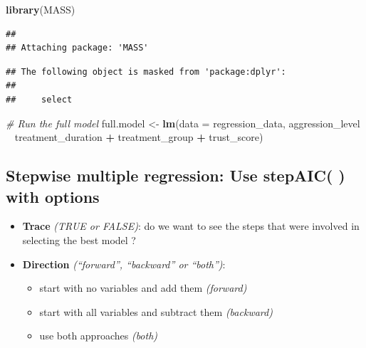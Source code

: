 \documentclass[
]{book}
\newenvironment{Shaded}{\begin{snugshade}}{\end{snugshade}}
\newcommand{\CommentTok}[1]{\textcolor[rgb]{0.56,0.35,0.01}{\textit{#1}}}
\newcommand{\DataTypeTok}[1]{\textcolor[rgb]{0.13,0.29,0.53}{#1}}
\newcommand{\KeywordTok}[1]{\textcolor[rgb]{0.13,0.29,0.53}{\textbf{#1}}}
\newcommand{\NormalTok}[1]{#1}
\newcommand{\OperatorTok}[1]{\textcolor[rgb]{0.81,0.36,0.00}{\textbf{#1}}}
\newcommand{\StringTok}[1]{\textcolor[rgb]{0.31,0.60,0.02}{#1}}
\providecommand{\tightlist}{%
  \setlength{\itemsep}{0pt}\setlength{\parskip}{0pt}}
\begin{document}
\begin{Shaded}
\begin{Highlighting}[]
\KeywordTok{library}\NormalTok{(MASS)}
\end{Highlighting}
\end{Shaded}

\begin{verbatim}
## 
## Attaching package: 'MASS'
\end{verbatim}

\begin{verbatim}
## The following object is masked from 'package:dplyr':
## 
##     select
\end{verbatim}

\begin{Shaded}
\begin{Highlighting}[]
\CommentTok{# Run the full model }
\NormalTok{full.model <-}\StringTok{ }\KeywordTok{lm}\NormalTok{(}\DataTypeTok{data =}\NormalTok{ regression_data, aggression_level }\OperatorTok{~}\StringTok{ }\NormalTok{treatment_duration }\OperatorTok{+}\StringTok{ }\NormalTok{treatment_group }\OperatorTok{+}\StringTok{ }\NormalTok{trust_score)}
\end{Highlighting}
\end{Shaded}

\hypertarget{stepwise-multiple-regression-use-stepaic-with-options}{%
\subsection{Stepwise multiple regression: Use stepAIC( ) with options}\label{stepwise-multiple-regression-use-stepaic-with-options}}

\begin{itemize}
\tightlist
\item
  \textbf{Trace} \emph{(TRUE or FALSE)}: do we want to see the steps that were involved in selecting the best model ?
\item
  \textbf{Direction} \emph{(``forward'', ``backward'' or ``both'')}:

  \begin{itemize}
  \tightlist
  \item
    start with no variables and add them \emph{(forward)}
  \item
    start with all variables and subtract them \emph{(backward)}
  \item
    use both approaches \emph{(both)}
  \end{itemize}
\end{itemize}
\end{document}
